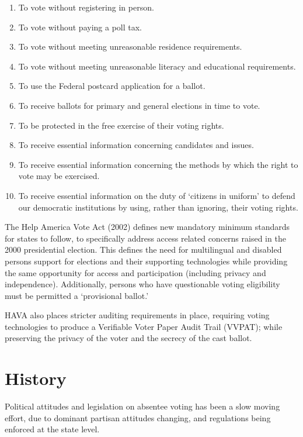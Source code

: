 \begin{enumerate}
  \item To vote without registering in person.
  \item To vote without paying a poll tax.
  \item To vote without meeting unreasonable residence requirements.
  \item To vote without meeting unreasonable literacy and educational requirements.
  \item To use the Federal postcard application for a ballot.
  \item To receive ballots for primary and general elections in time to vote.
  \item To be protected in the free exercise of their voting rights.
  \item To receive essential information concerning candidates and issues.
  \item To receive essential information concerning the methods by which the right to vote may be exercised.
  \item To receive essential information on the duty of `citizens in uniform' to defend our democratic institutions by using, rather than ignoring, their voting rights.
\end{enumerate}

The Help America Vote Act (2002) defines new mandatory minimum standards for states to follow, to specifically address access related concerns raised in the 2000 presidential election. This defines the need for multilingual and disabled persons support for elections and their supporting technologies while providing the same opportunity for access and participation (including privacy and independence). Additionally, persons who have questionable voting eligibility must be permitted a `provisional ballot.' 

HAVA also places stricter auditing requirements in place, requiring voting technologies to produce a Verifiable Voter Paper Audit Trail (VVPAT); while preserving the privacy of the voter and the secrecy of the cast ballot.


\section{History}
Political attitudes and legislation on absentee voting has been a slow moving effort, due to dominant partisan attitudes changing, and regulations being enforced at the state level.

